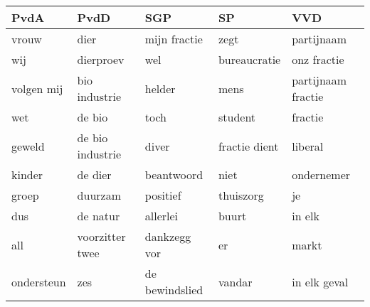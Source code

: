 \begin{tabular}{lllll}
\toprule
       PvdA &              PvdD &             SGP &             SP &                 VVD \\
\midrule
      vrouw &              dier &    mijn fractie &           zegt &          partijnaam \\
        wij &         dierproev &             wel &   bureaucratie &         onz fractie \\
 volgen mij &     bio industrie &          helder &           mens &  partijnaam fractie \\
        wet &            de bio &            toch &        student &             fractie \\
     geweld &  de bio industrie &           diver &  fractie dient &             liberal \\
     kinder &           de dier &      beantwoord &           niet &          ondernemer \\
      groep &           duurzam &        positief &      thuiszorg &                  je \\
        dus &          de natur &        allerlei &          buurt &              in elk \\
        all &   voorzitter twee &    dankzegg vor &             er &               markt \\
 ondersteun &               zes &  de bewindslied &         vandar &        in elk geval \\
\bottomrule
\end{tabular}
